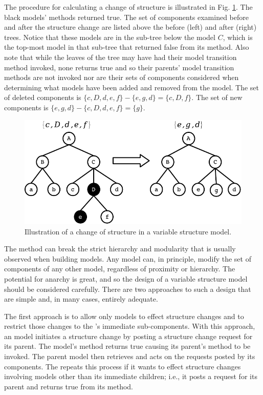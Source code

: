 The procedure for calculating a change of structure is illustrated in Fig. \ref{fig:set_defns}. The black models'  methods returned true. The set of components examined before and after the structure change are listed above the before (left) and after (right) trees. Notice that these models are in the sub-tree below the model $C$, which is the top-most model in that sub-tree that returned false from its  method. Also note that while the leaves of the tree may have had their model transition method invoked, none returns true and so their parents' model transition methods are not invoked nor are their sets of components considered when determining what models have been added and removed from the model. The set of deleted components is $\{c,D,d,e,f\}-\{e,g,d\} = \{c,D,f\}$. The set of new components is $\{e,g,d\} - \{c,D,d,e,f\} = \{g\}$.
\begin{figure}[ht]
\centering
\includegraphics{var_struct_models_figs/var_struct_model_sets.pdf}
\caption{Illustration of a change of structure in a variable structure model.}
\label{fig:set_defns}
\end{figure}

The  method can break the strict hierarchy and modularity that is usually observed when building  models. Any  model can, in principle, modify the set of components of any other model, regardless of proximity or hierarchy. The potential for anarchy is great, and so the design of a variable structure model should be considered carefully. There are two approaches to such a design that are simple and, in many cases, entirely adequate.

The first approach is to allow only  models to effect structure changes and to restrict those changes to the 's immediate sub-components. With this approach, an  model initiates a structure change by posting a structure change request for its parent. The  model's  method returns true causing its parent's  method to be invoked. The parent  model then retrieves and acts on the requests posted by its components. The  repeats this process if it wants to effect structure changes involving models other than its immediate children; i.e., it posts a request for its parent and returns true from its  method.

